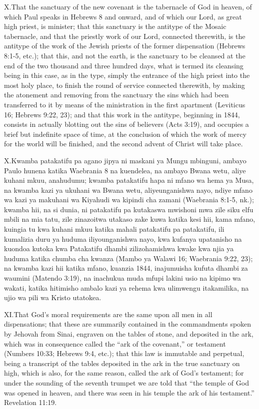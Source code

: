 \lettrine{X.} That the sanctuary of the new covenant is the tabernacle of God in heaven, of which Paul speaks in Hebrews 8 and onward, and of which our Lord, as great high priest, is minister; that this sanctuary is the antitype of the Mosaic tabernacle, and that the priestly work of our Lord, connected therewith, is the antitype of the work of the Jewish priests of the former dispensation (Hebrews 8:1-5, etc.); that this, and not the earth, is the sanctuary to be cleansed at the end of the two thousand and three hundred days, what is termed its cleansing being in this case, as in the type, simply the entrance of the high priest into the most holy place, to finish the round of service connected therewith, by making the atonement and removing from the sanctuary the sins which had been transferred to it by means of the ministration in the first apartment (Leviticus 16; Hebrews 9:22, 23); and that this work in the antitype, beginning in 1844, consists in actually blotting out the sins of believers (Acts 3:19), and occupies a brief but indefinite space of time, at the conclusion of which the work of mercy for the world will be finished, and the second advent of Christ will take place.


\lettrine{X.} Kwamba patakatifu pa agano jipya ni maskani ya Mungu mbinguni, ambayo Paulo hunena katika Waebrania 8 na kuendelea, na ambayo Bwana wetu, aliye kuhani mkuu, anahudumu; kwamba patakatifu hapa ni mfano wa hema ya Musa, na kwamba kazi ya ukuhani wa Bwana wetu, aliyeunganishwa nayo, ndiye mfano wa kazi ya makuhani wa Kiyahudi wa kipindi cha zamani (Waebrania 8:1-5, nk.); kwamba hii, na si dunia, ni patakatifu pa kutakaswa mwishoni mwa zile siku elfu mbili na mia tatu, zile zinazoitwa utakaso zake kuwa katika kesi hii, kama mfano, kuingia tu kwa kuhani mkuu katika mahali patakatifu pa patakatifu, ili kumalizia duru ya huduma iliyounganishwa nayo, kwa kufanya upatanisho na kuondoa kutoka kwa Patakatifu dhambi zilizohamishwa kwake kwa njia ya huduma katika chumba cha kwanza (Mambo ya Walawi 16; Waebrania 9:22, 23); na kwamba kazi hii katika mfano, kuanzia 1844, inajumuisha kufuta dhambi za waumini (Matendo 3:19), na inachukua muda mfupi lakini usio na kipimo wa wakati, katika hitimisho ambalo kazi ya rehema kwa ulimwengu itakamilika, na ujio wa pili wa Kristo utatokea.


\lettrine{XI.} That God’s moral requirements are the same upon all men in all dispensations; that these are summarily contained in the commandments spoken by Jehovah from Sinai, engraven on the tables of stone, and deposited in the ark, which was in consequence called the “ark of the covenant,” or testament (Numbers 10:33; Hebrews 9:4, etc.); that this law is immutable and perpetual, being a transcript of the tables deposited in the ark in the true sanctuary on high, which is also, for the same reason, called the ark of God’s testament; for under the sounding of the seventh trumpet we are told that “the temple of God was opened in heaven, and there was seen in his temple the ark of his testament.” Revelation 11:19.


